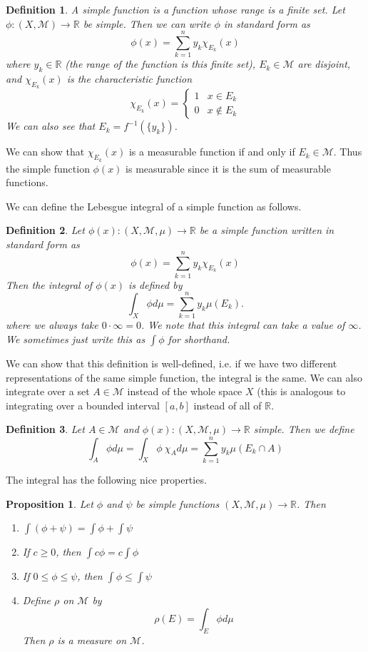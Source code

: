 \documentclass[12pt]{amsart}         %
\newtheorem{definition}{Definition}[section]
\newtheorem{proposition}{Proposition}[section]
\theoremstyle{remark}
\newcommand{\R}{\mathbb{R}}
\begin{document}
\begin{definition}
A \emph{simple function} is a function whose range is a finite set. Let $\phi: (X,\mathcal{M}) \rightarrow \R$ be simple. Then we can write $\phi$ in \emph{standard form} as 
\[
\phi(x) = \sum_{k = 1}^n
y_k \chi_{E_k}(x)
\]
where $y_k \in \R$ (the range of the function is this finite set), $E_k \in \mathcal{M}$ are disjoint, and $\chi_{E_k}(x)$ is the \emph{characteristic function}
\[
\chi_{E_k}(x) = \begin{cases}
    1 & x \in E_k \\
    0 & x \notin E_k
\end{cases}
\]
We can also see that $E_k = f^{-1}(\{ y_k \})$.
\end{definition}

We can show that $\chi_{E_k}(x)$ is a measurable function if and only if $E_k \in \mathcal{M}$. Thus the simple function $\phi(x)$ is measurable since it is the sum of measurable functions. 

We can define the Lebesgue integral of a simple function as follows.

\begin{definition}
Let $\phi(x): (X, \mathcal{M}, \mu) \rightarrow \R$ be a simple function written in standard form as 
\[
\phi(x) = \sum_{k = 1}^n
y_k \chi_{E_k}(x)
\]
Then the integral of $\phi(x)$ is defined by
\[
\int_X \phi d\mu = \sum\limits_{k=1}^n y_k \mu(E_k).
\]
where we always take $0 \cdot \infty = 0$. We note that this integral can take a value of $\infty$. We sometimes just write this as $\int \phi$ for shorthand. 
\end{definition}

We can show that this definition is well-defined, i.e. if we have two different representations of the same simple function, the integral is the same. We can also integrate over a set $A \in \mathcal{M}$ instead of the whole space $X$ (this is analogous to integrating over a bounded interval $[a,b]$ instead of all of $\R$.

\begin{definition}
Let $A \in \mathcal{M}$ and $\phi(x): (X, \mathcal{M}, \mu) \rightarrow \R$ simple. Then we define
\[
\int_A \phi d\mu = \int_X \phi \: \chi_A d \mu
= \sum\limits_{k=1}^n y_k \mu(E_k \cap A)
\]
\end{definition}

The integral has the following nice properties. 

\begin{proposition}
Let $\phi$ and $\psi$ be simple functions $(X, \mathcal{M}, \mu) \rightarrow \R$. Then
\begin{enumerate}
\item $\int (\phi + \psi) = \int \phi + \int \psi$
\item If $c \geq 0$, then $\int c \phi = c \int \phi$
\item If $0 \leq \phi \leq \psi$, then $\int \phi \leq \int \psi$
\item Define $\rho$ on $\mathcal{M}$ by 
\[
\rho(E) = \int_E \phi d\mu
\]
Then $\rho$ is a measure on $\mathcal{M}$.
\end{enumerate}
\end{proposition}
\end{document}
